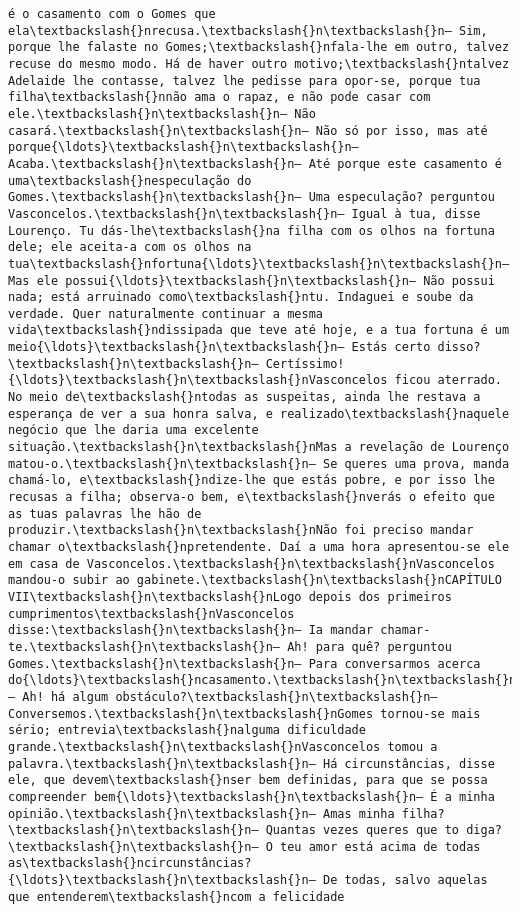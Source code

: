 \begin{Verbatim}[commandchars=\\\{\}]
é o casamento com o Gomes que ela\textbackslash{}nrecusa.\textbackslash{}n\textbackslash{}n— Sim, porque lhe falaste no Gomes;\textbackslash{}nfala-lhe em outro, talvez recuse do mesmo modo. Há de haver outro motivo;\textbackslash{}ntalvez Adelaide lhe contasse, talvez lhe pedisse para opor-se, porque tua filha\textbackslash{}nnão ama o rapaz, e não pode casar com ele.\textbackslash{}n\textbackslash{}n— Não casará.\textbackslash{}n\textbackslash{}n— Não só por isso, mas até porque{\ldots}\textbackslash{}n\textbackslash{}n— Acaba.\textbackslash{}n\textbackslash{}n— Até porque este casamento é uma\textbackslash{}nespeculação do Gomes.\textbackslash{}n\textbackslash{}n— Uma especulação? perguntou Vasconcelos.\textbackslash{}n\textbackslash{}n— Igual à tua, disse Lourenço. Tu dás-lhe\textbackslash{}na filha com os olhos na fortuna dele; ele aceita-a com os olhos na tua\textbackslash{}nfortuna{\ldots}\textbackslash{}n\textbackslash{}n— Mas ele possui{\ldots}\textbackslash{}n\textbackslash{}n— Não possui nada; está arruinado como\textbackslash{}ntu. Indaguei e soube da verdade. Quer naturalmente continuar a mesma vida\textbackslash{}ndissipada que teve até hoje, e a tua fortuna é um meio{\ldots}\textbackslash{}n\textbackslash{}n— Estás certo disso?\textbackslash{}n\textbackslash{}n— Certíssimo!{\ldots}\textbackslash{}n\textbackslash{}nVasconcelos ficou aterrado. No meio de\textbackslash{}ntodas as suspeitas, ainda lhe restava a esperança de ver a sua honra salva, e realizado\textbackslash{}naquele negócio que lhe daria uma excelente situação.\textbackslash{}n\textbackslash{}nMas a revelação de Lourenço matou-o.\textbackslash{}n\textbackslash{}n— Se queres uma prova, manda chamá-lo, e\textbackslash{}ndize-lhe que estás pobre, e por isso lhe recusas a filha; observa-o bem, e\textbackslash{}nverás o efeito que as tuas palavras lhe hão de produzir.\textbackslash{}n\textbackslash{}nNão foi preciso mandar chamar o\textbackslash{}npretendente. Daí a uma hora apresentou-se ele em casa de Vasconcelos.\textbackslash{}n\textbackslash{}nVasconcelos mandou-o subir ao gabinete.\textbackslash{}n\textbackslash{}nCAPÍTULO VII\textbackslash{}n\textbackslash{}nLogo depois dos primeiros cumprimentos\textbackslash{}nVasconcelos disse:\textbackslash{}n\textbackslash{}n— Ia mandar chamar-te.\textbackslash{}n\textbackslash{}n— Ah! para quê? perguntou Gomes.\textbackslash{}n\textbackslash{}n— Para conversarmos acerca do{\ldots}\textbackslash{}ncasamento.\textbackslash{}n\textbackslash{}n— Ah! há algum obstáculo?\textbackslash{}n\textbackslash{}n— Conversemos.\textbackslash{}n\textbackslash{}nGomes tornou-se mais sério; entrevia\textbackslash{}nalguma dificuldade grande.\textbackslash{}n\textbackslash{}nVasconcelos tomou a palavra.\textbackslash{}n\textbackslash{}n— Há circunstâncias, disse ele, que devem\textbackslash{}nser bem definidas, para que se possa compreender bem{\ldots}\textbackslash{}n\textbackslash{}n— É a minha opinião.\textbackslash{}n\textbackslash{}n— Amas minha filha?\textbackslash{}n\textbackslash{}n— Quantas vezes queres que to diga?\textbackslash{}n\textbackslash{}n— O teu amor está acima de todas as\textbackslash{}ncircunstâncias?{\ldots}\textbackslash{}n\textbackslash{}n— De todas, salvo aquelas que entenderem\textbackslash{}ncom a felicidade 
\end{Verbatim}
